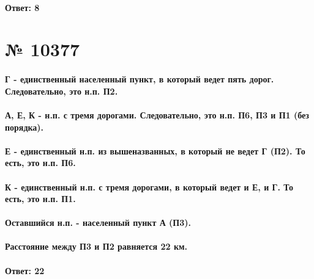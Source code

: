 \documentclass[11pt]{article} %
\begin{document}
\paragraph{Ответ: \textbf{8}}

\section{№ \textbf{10377}}

\paragraph{Г - единственный населенный пункт, в который ведет пять дорог. Следовательно, это н.п. П2.}

\paragraph{А, Е, К - н.п. с тремя дорогами. Следовательно, это н.п. П6, П3 и П1 (без порядка).}

\paragraph{Е - единственный н.п. из вышеназванных, в который не ведет Г (П2). То есть, это н.п. П6.}

\paragraph{К - единственный н.п. с тремя дорогами, в который ведет и Е, и Г. То есть, это н.п. П1.}

\paragraph{Оставшийся н.п. - населенный пункт А (П3).}

\paragraph{Расстояние между П3 и П2 равняется 22 км.}

\paragraph{Ответ: \textbf{22}}
\end{document}
